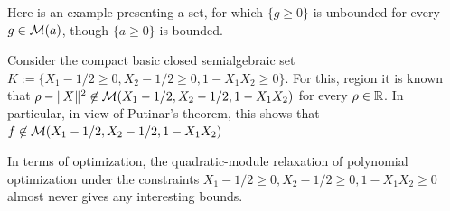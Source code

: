 Here is an example presenting a set, for which $\{g \ge 0\}$ is unbounded for every $g \in \mathcal{M}(a)$, though $\{a \ge 0\}$ is bounded. 

\begin{example}
\label{ex:jp:counterexample}
	Consider the compact basic closed semialgebraic set $K:=\{X_1 - 1/2 \ge 0, X_2 - 1/2 \ge 0, 1 - X_1 X_2 \ge 0\}$. 
	For this, region it is known that $\rho - \|X\|^2 \not\in \mathcal{M}(X_1 - 1/2,X_2-1/2,1 - X_1X_2)$ for every $\rho \in \mathbb{R}$. In particular, in view of Putinar's theorem, this shows that $f \not\in \mathcal{M}(X_1 - 1/2,X_2 - 1/2,1 - X_1X_2)$
	
	In terms of optimization, the quadratic-module relaxation of polynomial optimization under the constraints $X_1 - 1/2 \ge 0, X_2 - 1/2 \ge 0, 1 -X_1 X_2 \ge 0$ almost never gives any interesting bounds. 
\end{example}
